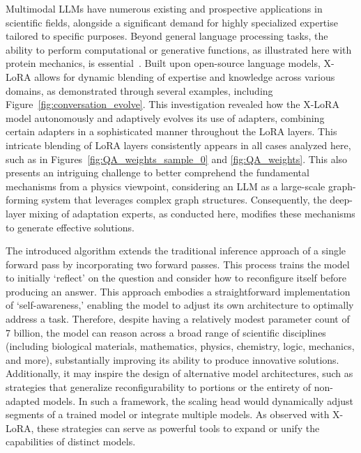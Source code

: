 Multimodal LLMs have numerous existing and prospective applications in scientific fields, alongside a significant demand for highly specialized expertise tailored to specific purposes. Beyond general language processing tasks, the ability to perform computational or generative functions, as illustrated here with protein mechanics, is essential~\cite{Luu2023BioinspiredLLM:Materials,Buehler2023MechGPTModalities,Buehler2023MeLMProblemsb}. Built upon open-source language models, X-LoRA allows for dynamic blending of expertise and knowledge across various domains, as demonstrated through several examples, including Figure~\ref{fig:conversation_evolve}. This investigation revealed how the X-LoRA model autonomously and adaptively evolves its use of adapters, combining certain adapters in a sophisticated manner throughout the LoRA layers. This intricate blending of LoRA layers consistently appears in all cases analyzed here, such as in Figures~\ref{fig:QA_weights_sample_0} and \ref{fig:QA_weights}. This also presents an intriguing challenge to better comprehend the fundamental mechanisms from a physics viewpoint, considering an LLM as a large-scale graph-forming system that leverages complex graph structures. Consequently, the deep-layer mixing of adaptation experts, as conducted here, modifies these mechanisms to generate effective solutions.

The introduced algorithm extends the traditional inference approach of a single forward pass by incorporating two forward passes. This process trains the model to initially ‘reflect’ on the question and consider how to reconfigure itself before producing an answer. This approach embodies a straightforward implementation of ‘self-awareness,’ enabling the model to adjust its own architecture to optimally address a task. Therefore, despite having a relatively modest parameter count of 7 billion, the model can reason across a broad range of scientific disciplines (including biological materials, mathematics, physics, chemistry, logic, mechanics, and more), substantially improving its ability to produce innovative solutions. Additionally, it may inspire the design of alternative model architectures, such as strategies that generalize reconfigurability to portions or the entirety of non-adapted models. In such a framework, the scaling head would dynamically adjust segments of a trained model or integrate multiple models. As observed with X-LoRA, these strategies can serve as powerful tools to expand or unify the capabilities of distinct models.

